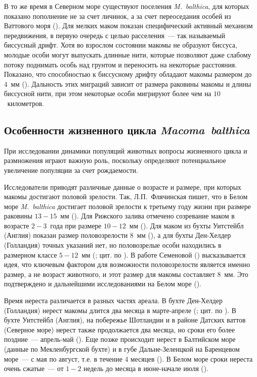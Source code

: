 В то же время в Северном море существуют поселения \textit{M.~balthica}, для которых показано пополнение не за счет личинок, а за счет переоседания особей из Ваттового моря (\cite{Beukema_deVlas_1989}). 
Для мелких маком показан специфический активный механизм передвижения, в первую очередь с целью расселения~--- так называемый биссусный дрифт. 
Хотя во взрослом состоянии макомы не образуют биссуса, молодые особи могут выпускать длинные нити, которые позволяют даже слабому потоку поднимать особь над грунтом и переносить на некоторые расстояния. 
Показано, что способностью к биссусному дрифту обладают макомы размером до $4$~мм (\cite{Armonies_Hellwig-Armonies_1992}). 
Дальность этих миграций зависит от размера раковины макомы и длины биссусной нити, при этом некоторые особи мигрируют более чем на $10$~километров. 

\subsection{Особенности жизненного цикла \textit{Macoma~balthica}}
При исследовании динамики популяций животных вопросы жизненного цикла и размножения играют важную роль, поскольку определяют потенциальное увеличение популяции за счет рождаемости. 

Исследователи приводят различные данные о возрасте и размере, при которых макомы достигают половой зрелости. 
Так, Л.П.~Флячинская пишет, что в Белом море \textit{M.~balthica} достигает половой зрелости к третьему году жизни при размере раковины $13-15$~мм (\cite{Flyachinskaya_1999}). 
Для Рижского залива отмечено созревание маком в возрасте $2-3$~года при размере $10-12$~мм (\cite{Karpevich_1968}). 
Для маком из бухты Уитстейбл (Англия) показан размер половозрелости $8$~мм (\cite{Caddy_1967}), а для бухты Ден-Хелдер (Голландия) точных указаний нет, но половозрелые особи находились в размерном классе $5-12$~мм (\cite{Lammens_1967}; цит. по \cite{Semenova_1980}).  
В работе Семеновой (\cite*{Semenova_1980}) высказывается идея, что ключевым фактором для возможности половозрелости является именно размер, а не возраст животного, и этот размер для макомы составляет $8$~мм. 
Это подтверждено и дальнейшими исследованиями на Белом море (\cite{Maximovich_1985}).

Время нереста различается в разных частях ареала. 
В бухте Ден-Хелдер (Голландия) нерест макомы длится два месяца в марте-апреле (\cite{Lammens_1967}; цит. по \cite{Semenova_1980}). 
В бухте Уитстейбл (Англия), на побережье Шотландии и в районе Датских ваттов (Северное море) нерест также продолжается два месяца, но сроки его более поздние~--- апрель-май (\cite{Caddy_1967, Stephen_1931}). 
Еще позже происходит нерест в Балтийском море (данные по Мекленбургской бухте) и в губе Дальне-Зеленцкой на Баренцевом море~--- с мая по август, т.е. в течение 4 месяцев (\cite{Oertzen_1972, Agarova_1974}). 
В Белом море сроки нереста очень сжатые~--- от $1-2$ недель до месяца в июне-начале июля (\cite{Semenova_1980, Maximovich_1985, Zubakha_et_al_2000}).

